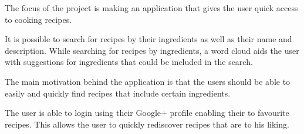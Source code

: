 The focus of the project is making an application that gives the user quick access to cooking recipes.

It is possible to search for recipes by their ingredients as well as their name and description. While searching for recipes by ingredients, a word cloud aids the user with suggestions for ingredients that could be included in the search.

The main motivation behind the application is that the users should be able to easily and quickly find recipes that include certain ingredients.

The user is able to login using their Google+ profile enabling their to favourite recipes. This allows the user to quickly rediscover recipes that are to his liking.
